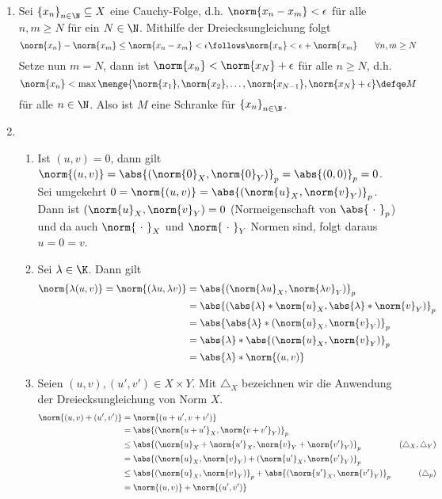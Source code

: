 \begin{exercisePage}
	\begin{enumerate}[leftmargin=\zulength, label=(zu \alph*)]
		\item Sei $\folge{x_n}{n \in \N} \subseteq X$ eine Cauchy-Folge, d.h. $\norm{x_n - x_m} < \epsilon$ für alle $n,m \ge N$ für ein $N \in \N$. Mithilfe der Dreiecksungleichung folgt
		\begin{equation*}
			\norm{x_n} - \norm{x_m} \le \norm{x_n - x_m} < \epsilon \follows \norm{x_n} < \epsilon + \norm{x_m} \qquad \forall n,m \ge N
		\end{equation*}
		Setze nun $m = N$, dann ist $\norm{x_n} < \norm{x_N} + \epsilon$ für alle $n \ge N$, d.h.
		\begin{equation*}
			\norm{x_n} < \max \menge{\norm{x_1}, \norm{x_2}, \dots , \norm{x_{N-1}}, \norm{x_N} + \epsilon} \defqe M
		\end{equation*} 
		für alle $n \in \N$. Also ist $M$ eine Schranke für $\folge{x_n}{n \in \N}$.
		\item  
		\begin{enumerate}[label=(\textit{\roman*})]
			\item Ist $(u,v) = 0$, dann gilt $\norm{(u,v)} = \abs{(\norm{0}_X, \norm{0}_Y)}_p = \abs{(0,0)}_p = 0$.
			Sei umgekehrt $0 = \norm{(u,v)} = \abs{(\norm{u}_X , \norm{v}_Y)}_p$. Dann ist $(\norm{u}_X , \norm{v}_Y) = 0$ (Normeigenschaft von $\abs{\ \cdot \ }_p$) und da auch $\norm{\ \cdot \ }_X$ und $\norm{\ \cdot \ }_Y$ Normen sind, folgt daraus $u = 0 = v$.
			\item  Sei $\lambda \in \K$. Dann gilt 
			\begin{align*}
				\norm{\lambda (u,v)} = \norm{(\lambda u , \lambda  v)} 
				&= \abs{(\norm{\lambda u}_X , \norm{\lambda v}_Y)}_p \\
				&= \abs{(\abs{\lambda} * \norm{u}_X , \abs{\lambda} * \norm{v}_Y)}_p \\
				&= \abs{\abs{\lambda} * (\norm{u}_X , \norm{v}_Y)}_p \\
				&= \abs{\lambda} * \abs{(\norm{u}_X , \norm{v}_Y)}_p \\
				&= \abs{\lambda} * \norm{(u,v)}
			\end{align*}
			\pagebreak
			\item Seien $(u,v),(u',v') \in X \times Y$. Mit $\triangle_X$ bezeichnen wir die Anwendung der Dreiecksungleichung von Norm $X$.
			\begin{align*}
				\norm{(u,v) + (u',v')} &= \norm{(u+u',v+v')} \\
				&= \abs{(\norm{u+u'}_X, \norm{v+v'}_Y)}_p \\
				&\le \abs{(\norm{u}_X + \norm{u'}_X , \norm{v}_Y + \norm{v'}_Y)}_p & (\triangle_X, \triangle_Y) \\
				&= \abs{(\norm{u}_X, \norm{v}_Y) + (\norm{u'}_X, \norm{v'}_Y)}_p \\
				&\le \abs{(\norm{u}_X , \norm{v}_Y)}_p + \abs{(\norm{u'}_X , \norm{v'}_Y)}_p & (\triangle_p) \\
				&= \norm{(u,v)} + \norm{(u',v')}
			\end{align*}
		\end{enumerate}
		

\end{enumerate}
\end{exercisePage}
